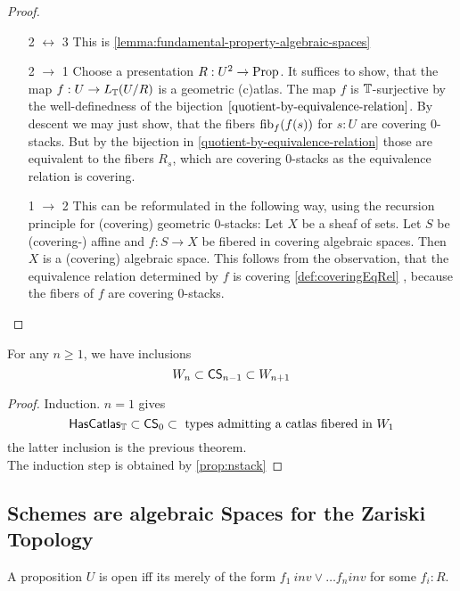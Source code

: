 \begin{proof}
\ 	\begin{enumerate}
	\item [2 $\leftrightarrow$ 3]
		This is \ref {lemma:fundamental-property-algebraic-spaces}
	\item [2 $\to$ 1]
	Choose a presentation $ R: U^2 \to \operatorname{Prop}$.
	It suffices to show, that the map $f : U \to L_{\mathbb{T}} ( U / R)$ is a geometric (c)atlas. The map $f$ is $\mathbb{T}$-surjective by the well-definedness of the bijection $\ref{quotient-by-equivalence-relation}$. By descent we may just show, that the fibers $\operatorname{fib}_f (f(s))$ for $s : U$ are covering 0-stacks. But by the bijection in \ref{quotient-by-equivalence-relation} those are equivalent to the fibers $R_s$, which are covering 0-stacks as the equivalence relation is covering. \\
	\item [1 $\to$ 2]
	This can be reformulated in the following way, using the recursion principle for (covering) geometric 0-stacks:
	Let $X$ be a sheaf of sets. Let $S$ be (covering-) affine and $f : S \to X$ be fibered in covering algebraic spaces. Then $X$ is a (covering) algebraic space.
This follows from the observation, that the equivalence relation determined by $f$ is covering \ref{def:coveringEqRel} , because the fibers of $f$ are covering 0-stacks.
	\end{enumerate}
\end{proof}
\begin{prop}
	For any $n \ge 1$, we have inclusions 
	\[W_{n} \subset \mathsf{CS}_{n-1} \subset W_{n+1}\]
\end{prop}
\begin{proof}
	Induction. $n = 1$ gives
	\[
	\mathsf{HasCatlas}_{\mathbb{T}} \subset \mathsf{CS}_0 \subset \text{ types admitting a catlas fibered in } W_1
	\]
	the latter inclusion is the previous theorem. \\
	The induction step is obtained by \ref{prop:nstack}
\end{proof}
\subsection{Schemes are algebraic Spaces for the Zariski Topology}
\begin{definition}
 A proposition $U$ is open iff its merely of the form $f_1 \ inv \lor \hdots f_n inv$ for some $f_i : R$.
\end{definition}

